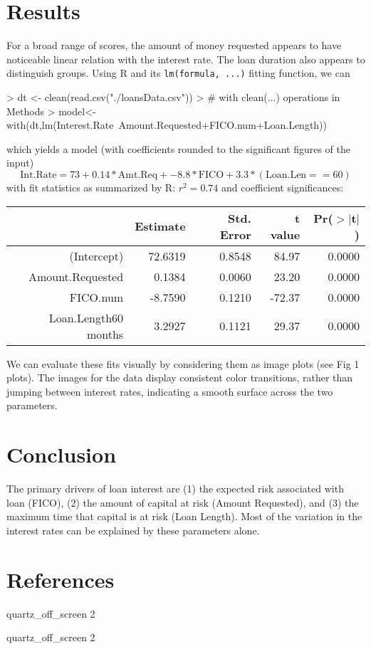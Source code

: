 \documentclass{article}
\begin{document}
\section{Results}
For a broad range of scores, the amount of money requested appears to have noticeable linear relation with the interest rate.  The loan duration also appears to distinguish groups.  Using R and its \texttt{lm(formula, ...)} fitting function, we can
\begin{Schunk}
\begin{Sinput}
> dt <- clean(read.csv("./loansData.csv"))
> # with clean(...) operations in Methods
> model<-with(dt,{lm(Interest.Rate~Amount.Requested+FICO.num+Loan.Length)})
\end{Sinput}
\end{Schunk}
which yields a model (with coefficients rounded to the significant figures of the input)
$$
\textrm{Int.Rate} = 73 + 0.14*\textrm{Amt.Req} + -8.8*\textrm{FICO} + 3.3*(\textrm{Loan.Len} == 60)
$$
with fit statistics as summarized by R: $r^2 = 0.74$ and coefficient significances:
\begin{table}[ht]
\centering
\begin{tabular}{rrrrr}
  \hline
 & Estimate & Std. Error & t value & Pr($>$$|$t$|$) \\ 
  \hline
(Intercept) & 72.6319 & 0.8548 & 84.97 & 0.0000 \\ 
  Amount.Requested & 0.1384 & 0.0060 & 23.20 & 0.0000 \\ 
  FICO.num & -8.7590 & 0.1210 & -72.37 & 0.0000 \\ 
  Loan.Length60 months & 3.2927 & 0.1121 & 29.37 & 0.0000 \\ 
   \hline
\end{tabular}
\end{table}
We can evaluate these fits visually by considering them as image plots (see Fig 1 plots).  The images for the data display consistent color transitions, rather than jumping between interest rates, indicating a smooth surface across the two parameters.

\section{Conclusion}
The primary drivers of loan interest are (1) the expected risk associated with loan (FICO), (2) the amount of capital at risk (Amount Requested), and (3) the maximum time that capital is at risk (Loan Length).  Most of the variation in the interest rates can be explained by these parameters alone.

\section{References}


\begin{Schunk}
\begin{Soutput}
quartz_off_screen 
                2 
\end{Soutput}
\begin{Soutput}
quartz_off_screen 
                2 
\end{Soutput}
\end{Schunk}
\end{document}
